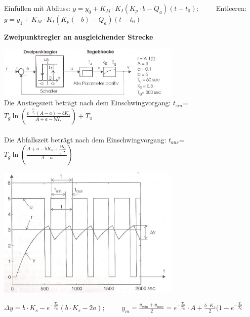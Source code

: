          Einfüllen mit Abfluss: $y = y_0 + K_M \cdot K_I(K_p \cdot b - Q_a)(t-t_0); \qquad$ 
         Entleeren: $y=y_1 + K_M \cdot K_I(K_p(-b) - Q_a)(t-t_0)$
    
	\vspace{.5cm}
		\textbf{Zweipunktregler an ausgleichender Strecke } \\
		\begin{minipage}{9cm}
 		\includegraphics[width=9cm]{./bilder/ZweipunktreglerTotglied2.jpg}\\
			Die Anstiegszeit beträgt nach dem Einschwingvorgang:
			$t_{ein}$=$T_g\ln(\frac{e^{-\frac{T_u}{T_g}}(A-a)-b K_s}{A+a-b K_s})+T_u$\\ \\
			Die Abfallszeit beträgt nach dem Einschwingvorgang:
			$t_{aus}$=$T_g\ln(\frac{A+a-b
			K_s+\frac{b K_s}{e^{-\frac{T_u}{T_g}}}}{A-a})$\\
        \end{minipage}
		\begin{minipage}{9cm}
		\includegraphics[width=9cm]{./bilder/ZweipunktreglerTotglied_dia.jpg}			
        \end{minipage}
    
 	$\Delta y = b\cdot K_s - e^{-\frac{T_u}{T_G}}(b\cdot K_s - 2a); \qquad$
	$y_m = \frac{y_{min}+y_{max}}{2}=e^{-\frac{T_u}{T_G}}\cdot A + \frac{b\cdot K_s}{2}(1-e^{-\frac{T_u}{T_G}}$

